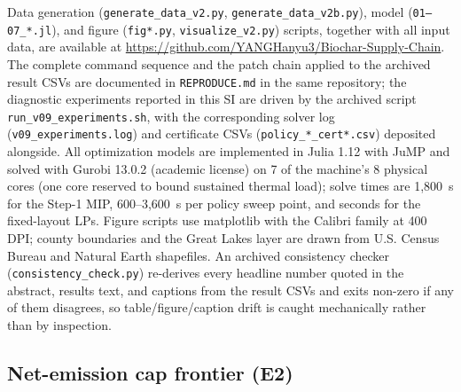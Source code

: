 Data generation (\texttt{generate\_data\_v2.py}, \texttt{generate\_data\_v2b.py}),
model (\texttt{01--07\_*.jl}), and figure (\texttt{fig*.py},
\texttt{visualize\_v2.py}) scripts, together with all input data, are available
at \url{https://github.com/YANGHanyu3/Biochar-Supply-Chain}. The complete
command sequence and the patch chain applied to the archived result CSVs are
documented in \texttt{REPRODUCE.md} in the same repository; the diagnostic
experiments reported in this SI are driven by the archived script
\texttt{run\_v09\_experiments.sh}, with the corresponding solver log
(\texttt{v09\_experiments.log}) and certificate CSVs
(\texttt{policy\_*\_cert*.csv}) deposited alongside. All optimization models are
implemented in Julia 1.12 with JuMP and solved with Gurobi 13.0.2 (academic
license) on 7 of the machine's 8 physical cores (one core reserved to bound
sustained thermal load); solve times are 1{,}800~s for the Step-1 MIP,
600--3{,}600~s per policy sweep point, and seconds for the fixed-layout LPs.
Figure scripts use matplotlib with the Calibri family at 400 DPI; county
boundaries and the Great Lakes layer are drawn from U.S. Census Bureau and
Natural Earth shapefiles. An archived consistency checker
(\texttt{consistency\_check.py}) re-derives every headline number quoted in
the abstract, results text, and captions from the result CSVs and exits
non-zero if any of them disagrees, so table/figure/caption drift is caught
mechanically rather than by inspection.

\subsection{Net-emission cap frontier (E2)}

